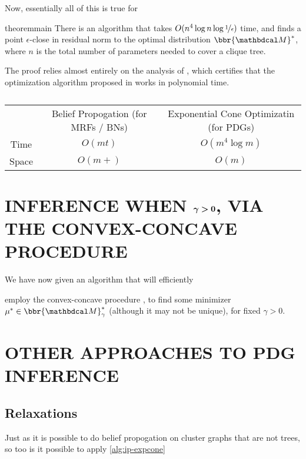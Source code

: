 \documentclass[twoside]{article}
\begin{document}
Now, essentially all of this is true for  

\begin{linked}{theorem}{main}
There is an algorithm that takes $O(n^4 \log n  \log \nicefrac1\epsilon )$ time,
and finds a point $\epsilon$-close in residual norm to the optimal distribution
$\bbr{\dg M}^*$, where $n$ is the total number of parameters needed to cover a clique tree.
\end{linked}


The proof relies almost entirely on the analysis of \textcite{badenbroek2021algorithm},
which certifies that the optimization algorithm 
proposed in \textcite{dahl2022primal} works in polynomial time. 

\begin{table}
    \begin{tabular}{ccc}
        & Belief Propogation (for MRFs / BNs) &  Exponential Cone Optimizatin (for PDGs) \\
        Time & $O(m t)$ & $O( m^4 \log m )$ \\
        Space & $O(m + )$ & $O( m )$
    \end{tabular}
    \caption{ }
\end{table}


\section{INFERENCE WHEN
    \texorpdfstring{$\boldsymbol\gamma \boldsymbol> \mathbf{0}$}{gamma > 0},
    VIA THE CONVEX-CONCAVE PROCEDURE }

We have now given an algorithm that will efficiently    


employ the convex-concave procedure 
\parencite{yuille2003concave}, to find some minimizer $\mu^* \in \bbr{\dg M}^*_\gamma$ (although it may not be unique), for fixed $\gamma > 0$.
        
\section{OTHER APPROACHES TO PDG INFERENCE}

\subsection{Relaxations}
Just as it is possible to do belief propogation on cluster graphs that are not trees,
so too is it possible to apply 
\cref{alg:ip-expcone}
\end{document}
